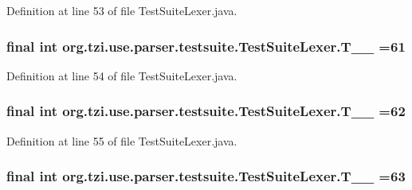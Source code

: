 Definition at line 53 of file Test\-Suite\-Lexer.\-java.

\hypertarget{classorg_1_1tzi_1_1use_1_1parser_1_1testsuite_1_1_test_suite_lexer_a1dca8d86d21934d1612c89cfe3fc2442}{
\subsubsection[{T\-\_\-\-\_\-61}]{\setlength{\rightskip}{0pt plus 5cm}final int org.\-tzi.\-use.\-parser.\-testsuite.\-Test\-Suite\-Lexer.\-T\-\_\-\-\_ =61\hspace{0.3cm}{\ttfamily [static]}}}\label{classorg_1_1tzi_1_1use_1_1parser_1_1testsuite_1_1_test_suite_lexer_a1dca8d86d21934d1612c89cfe3fc2442}


Definition at line 54 of file Test\-Suite\-Lexer.\-java.

\hypertarget{classorg_1_1tzi_1_1use_1_1parser_1_1testsuite_1_1_test_suite_lexer_a5a5f549b5d5b4c50ef390be857c5cf52}{
\subsubsection[{T\-\_\-\-\_\-62}]{\setlength{\rightskip}{0pt plus 5cm}final int org.\-tzi.\-use.\-parser.\-testsuite.\-Test\-Suite\-Lexer.\-T\-\_\-\-\_ =62\hspace{0.3cm}{\ttfamily [static]}}}\label{classorg_1_1tzi_1_1use_1_1parser_1_1testsuite_1_1_test_suite_lexer_a5a5f549b5d5b4c50ef390be857c5cf52}


Definition at line 55 of file Test\-Suite\-Lexer.\-java.

\hypertarget{classorg_1_1tzi_1_1use_1_1parser_1_1testsuite_1_1_test_suite_lexer_a37b19df8357a6500de729be8f9719ff0}{
\subsubsection[{T\-\_\-\-\_\-63}]{\setlength{\rightskip}{0pt plus 5cm}final int org.\-tzi.\-use.\-parser.\-testsuite.\-Test\-Suite\-Lexer.\-T\-\_\-\-\_ =63\hspace{0.3cm}{\ttfamily [static]}}}\label{classorg_1_1tzi_1_1use_1_1parser_1_1testsuite_1_1_test_suite_lexer_a37b19df8357a6500de729be8f9719ff0}


